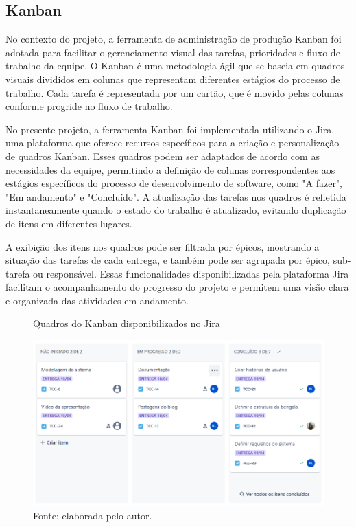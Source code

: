     \subsection{Kanban}
    No contexto do projeto, a ferramenta de administração de produção Kanban foi adotada para facilitar o gerenciamento visual das tarefas, prioridades e fluxo de trabalho da equipe. O Kanban é uma metodologia ágil que se baseia em quadros visuais divididos em colunas que representam diferentes estágios do processo de trabalho. Cada tarefa é representada por um cartão, que é movido pelas colunas conforme progride no fluxo de trabalho.

    No presente projeto, a ferramenta Kanban foi implementada utilizando o Jira, uma plataforma que oferece recursos específicos para a criação e personalização de quadros Kanban. Esses quadros podem ser adaptados de acordo com as necessidades da equipe, permitindo a definição de colunas correspondentes aos estágios específicos do processo de desenvolvimento de software, como "A fazer", "Em andamento" e "Concluído". A atualização das tarefas nos quadros é refletida instantaneamente quando o estado do trabalho é atualizado, evitando duplicação de itens em diferentes lugares.
    
    A exibição dos itens nos quadros pode ser filtrada por épicos, mostrando a situação das tarefas de cada entrega, e também pode ser agrupada por épico, sub-tarefa ou responsável. Essas funcionalidades disponibilizadas pela plataforma Jira facilitam o acompanhamento do progresso do projeto e permitem uma visão clara e organizada das atividades em andamento.

    \begin{figure}[h!]
        \captionsetup{width=1\textwidth}
        \caption{\label{fig:kanban} Quadros do Kanban disponibilizados no Jira}
        \centering
        \includegraphics[width=1\textwidth]{figuras/kanban} 
        \caption*{Fonte: elaborada pelo autor.}
    \end{figure}

